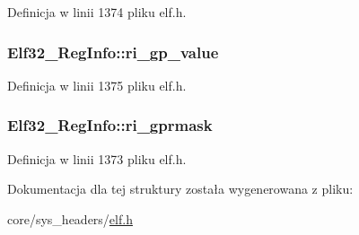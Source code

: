 Definicja w linii 1374 pliku elf.\-h.

\hypertarget{struct_elf32___reg_info_ae464ec715b979270bedadc8889f94a16}{
\subsubsection[{ri\-\_\-gp\-\_\-value}]{ Elf32\-\_\-\-Reg\-Info\-::ri\-\_\-gp\-\_\-value}}\label{struct_elf32___reg_info_ae464ec715b979270bedadc8889f94a16}


Definicja w linii 1375 pliku elf.\-h.

\hypertarget{struct_elf32___reg_info_a14e7256134e34950e4fb5681d77dd353}{
\subsubsection[{ri\-\_\-gprmask}]{ Elf32\-\_\-\-Reg\-Info\-::ri\-\_\-gprmask}}\label{struct_elf32___reg_info_a14e7256134e34950e4fb5681d77dd353}


Definicja w linii 1373 pliku elf.\-h.



Dokumentacja dla tej struktury została wygenerowana z pliku\-:\begin{DoxyCompactItemize}
\item 
core/sys\-\_\-headers/\hyperlink{elf_8h}{elf.\-h}\end{DoxyCompactItemize}
